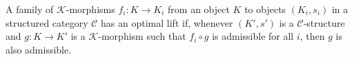 A family of $\mathcal{K}$-morphisms $f_i: K \to K_i$ from an object $K$ to objects $(K_i, s_i)$ in a structured category $\mathcal{C}$ has an optimal lift if, whenever $(K', s')$ is a $\mathcal{C}$-structure and $g: K \to K'$ is a $\mathcal{K}$-morphism such that $f_i \circ g$ is admissible for all $i$, then $g$ is also admissible.

